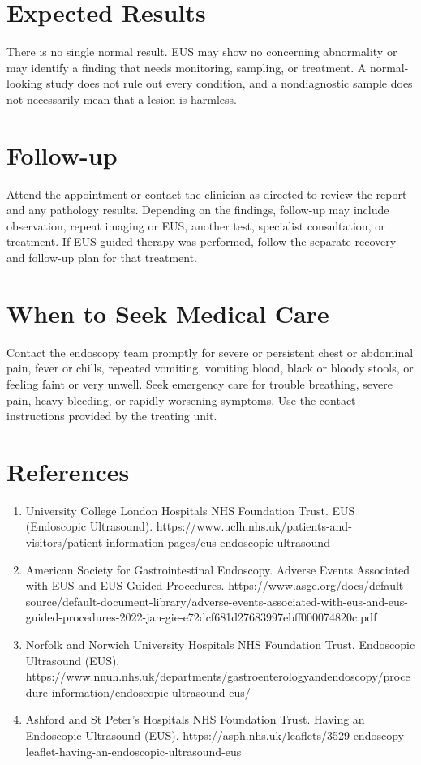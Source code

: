 \section*{Expected Results}
There is no single normal result. EUS may show no concerning abnormality or may identify a finding that needs monitoring, sampling, or treatment. A normal-looking study does not rule out every condition, and a nondiagnostic sample does not necessarily mean that a lesion is harmless.

\section*{Follow-up}
Attend the appointment or contact the clinician as directed to review the report and any pathology results. Depending on the findings, follow-up may include observation, repeat imaging or EUS, another test, specialist consultation, or treatment. If EUS-guided therapy was performed, follow the separate recovery and follow-up plan for that treatment.

\section*{When to Seek Medical Care}
Contact the endoscopy team promptly for severe or persistent chest or abdominal pain, fever or chills, repeated vomiting, vomiting blood, black or bloody stools, or feeling faint or very unwell. Seek emergency care for trouble breathing, severe pain, heavy bleeding, or rapidly worsening symptoms. Use the contact instructions provided by the treating unit.

\section*{References}
\begin{enumerate}
  \item University College London Hospitals NHS Foundation Trust. EUS (Endoscopic Ultrasound). https://www.uclh.nhs.uk/patients-and-visitors/patient-information-pages/eus-endoscopic-ultrasound
  \item American Society for Gastrointestinal Endoscopy. Adverse Events Associated with EUS and EUS-Guided Procedures. https://www.asge.org/docs/default-source/default-document-library/adverse-events-associated-with-eus-and-eus-guided-procedures-2022-jan-gie-e72dcf681d27683997ebff000074820c.pdf
  \item Norfolk and Norwich University Hospitals NHS Foundation Trust. Endoscopic Ultrasound (EUS). https://www.nnuh.nhs.uk/departments/gastroenterologyandendoscopy/procedure-information/endoscopic-ultrasound-eus/
  \item Ashford and St Peter's Hospitals NHS Foundation Trust. Having an Endoscopic Ultrasound (EUS). https://asph.nhs.uk/leaflets/3529-endoscopy-leaflet-having-an-endoscopic-ultrasound-eus
\end{enumerate}

\clearpage
